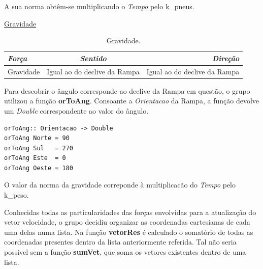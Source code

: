 \documentclass[a4paper]{report} %
\begin{document}
A sua norma obtêm-se multiplicando o \emph{Tempo} pelo k_pneus.

\newpage

\maketitle\underline{Gravidade}

\begin{table}[!h]
\begin{center}
\begin{tabular}{|l|c|r|}
    
    \hline
  \emph{Força} & \emph{Sentido} & \emph{Direção} \\
    \hline
  Gravidade &  Igual ao do declive da Rampa & Igual ao do declive da Rampa \\
    \hline

\end{tabular}
\end{center}
\caption{Gravidade.}
\end{table}

Para descobrir o ângulo corresponde ao declive da Rampa em questão, o grupo utilizou a função \textbf{orToAng}. Consoante a \emph{Orientacao} da Rampa, a função devolve um \emph{Double} correspondente ao valor do ângulo.

\begin{verbatim}
orToAng:: Orientacao -> Double
orToAng Norte = 90 
orToAng Sul   = 270
orToAng Este  = 0
orToAng Oeste = 180
\end{verbatim} 

O valor da norma da gravidade correponde à multiplicacão do \emph{Tempo} pelo k_peso.

Conhecidas todas as particularidades das forças envolvidas para a atualização do vetor velocidade, o grupo decidiu organizar as coordenadas cartesianas de cada uma delas numa lista. Na função \textbf{vetorRes} é calculado o somatório de todas as coordenadas presentes dentro da lista anteriormente referida. Tal não seria possivel sem a função \textbf{sumVet}, que soma os vetores existentes dentro de uma lista.
\end{document}
